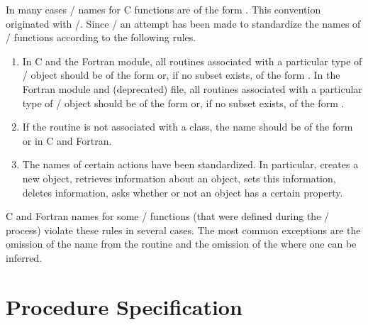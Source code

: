 In many cases \MPI/ names for C functions are of the form
. This convention originated with \MPII/. Since \MPIII/ an
attempt has been made to standardize the names of \MPI/ functions according to
the following rules.

\begin{enumerate}
\item
In C and the Fortran  module, all routines associated with a particular type of \MPI/ object
should be of the form  or, if no subset
exists, of the form .
In the Fortran  module and (deprecated)  file, all routines
associated with a particular type of \MPI/ object should be of the form
 or, if no subset exists, of the form
.

\item
If the routine is not associated with a class, the name
should be of the form  or
 in C and Fortran.

\item
The names of certain actions have been standardized. In
particular, 
creates a new object, 
retrieves information about an object,  sets
this information,  deletes information,
 asks whether or not an object has a certain property.

\end{enumerate}

C and Fortran names for
some \MPI/ functions (that were defined during the \MPII/ process)
violate these rules
in several cases. The most common exceptions are the omission
of the  name from the routine and the omission of
the  where one can be inferred.


\section{Procedure Specification}
\label{terms:procedure-specification}

